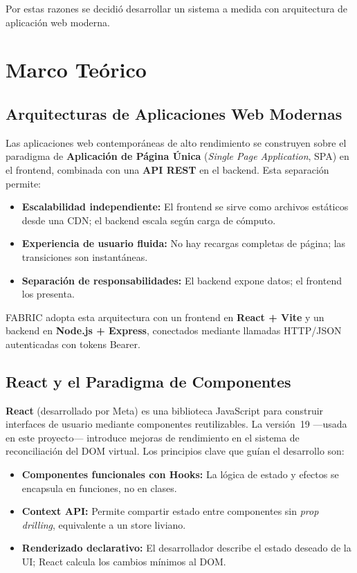 \documentclass[12pt, a4paper, twoside]{report}
\begin{document}
Por estas razones se decidió desarrollar un sistema a medida con arquitectura de aplicación
web moderna.

\clearpage
\chapter{Marco Teórico}

\section{Arquitecturas de Aplicaciones Web Modernas}

Las aplicaciones web contemporáneas de alto rendimiento se construyen sobre el paradigma de
\textbf{Aplicación de Página Única} (\textit{Single Page Application}, SPA) en el frontend,
combinada con una \textbf{API REST} en el backend. Esta separación permite:

\begin{itemize}
  \item \textbf{Escalabilidad independiente:} El frontend se sirve como archivos estáticos
        desde una CDN; el backend escala según carga de cómputo.
  \item \textbf{Experiencia de usuario fluida:} No hay recargas completas de página; las
        transiciones son instantáneas.
  \item \textbf{Separación de responsabilidades:} El backend expone datos; el frontend los
        presenta.
\end{itemize}

FABRIC adopta esta arquitectura con un frontend en \textbf{React + Vite} y un backend en
\textbf{Node.js + Express}, conectados mediante llamadas HTTP/JSON autenticadas con tokens
Bearer.

\section{React y el Paradigma de Componentes}

\textbf{React} (desarrollado por Meta) es una biblioteca JavaScript para construir interfaces
de usuario mediante componentes reutilizables. La versión~19 ---usada en este proyecto---
introduce mejoras de rendimiento en el sistema de reconciliación del DOM virtual. Los principios
clave que guían el desarrollo son:

\begin{itemize}
  \item \textbf{Componentes funcionales con Hooks:} La lógica de estado y efectos se encapsula
        en funciones, no en clases.
  \item \textbf{Context API:} Permite compartir estado entre componentes sin
        \textit{prop drilling}, equivalente a un store liviano.
  \item \textbf{Renderizado declarativo:} El desarrollador describe el estado deseado de la UI;
        React calcula los cambios mínimos al DOM.
\end{itemize}
\end{document}
